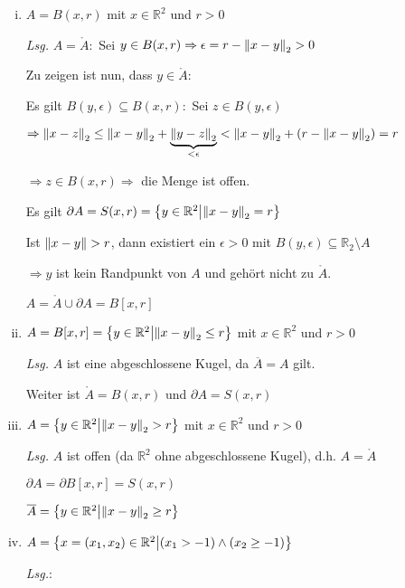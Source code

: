 \documentclass{article}
\begin{document}
\begin{enumerate}[(i)]
\item $A = B(x, r)$ mit $x \in \mathbb{R}^2$ und $r > 0$

  \textit{Lsg.} $A = \mathring A \colon $ Sei $y \in B(x, r) \Rightarrow \epsilon = r - \norm{x - y}_2 > 0$

  Zu zeigen ist nun, dass $y \in \mathring A$:

  Es gilt $B(y, \epsilon) \subseteq B(x, r) \colon$ Sei $z \in B(y, \epsilon)$

  $\Rightarrow \norm{x - z}_2 \leq \norm{x - y}_2 + \underset{< \epsilon}{\underbrace{\norm{y - z}_2}}
  < \norm{x - y}_2 + (r - \norm{x - y}_2) = r$

  $\Rightarrow z \in B(x, r) \Rightarrow$ die Menge ist offen.

  Es gilt $\partial A = S(x, r) = \qty{ y \in \mathbb{R}^2 \middle| \norm{x - y}_2 = r }$

  Ist $\norm{x - y} > r$, dann existiert ein $\epsilon > 0$ mit
  $B(y, \epsilon) \subseteq \mathbb{R}_2 \setminus A$

  $\Rightarrow y$ ist kein Randpunkt von $A$ und gehört nicht zu $\mathring A$.

  $A = \mathring A \cup \partial A = B[x, r]$
\item $A = B[x, r] = \qty{y \in \mathbb{R}^2 \middle| \norm{x - y}_2 \leq r}$ mit $x \in \mathbb{R}^2$ und $r > 0$

  \textit{Lsg.} $A$ ist eine abgeschlossene Kugel, da $\overline A = A$ gilt.

  Weiter ist $\mathring A = B(x, r)$ und $\partial A = S(x, r)$

\item $A = \qty{y \in \mathbb{R}^2 \middle| \norm{x - y}_2 > r}$ mit $x \in \mathbb{R}^2$ und $r > 0$

  \textit{Lsg.} $A$ ist offen (da $\mathbb{R}^2$ ohne abgeschlossene Kugel), d.h. $A = \mathring A$

  $\partial A = \partial B[x, r] = S(x, r)$

  $\overline A = \qty{y \in \mathbb{R}^2 \middle| \norm{x - y}_2 \geq r}$

\item $A = \qty{x = \qty(x_1, x_2) \in \mathbb{R}^2 \middle| \qty(x_1 > -1) \land \qty(x_2 \geq -1)}$

  \textit{Lsg.}:


\end{enumerate}
\end{document}

